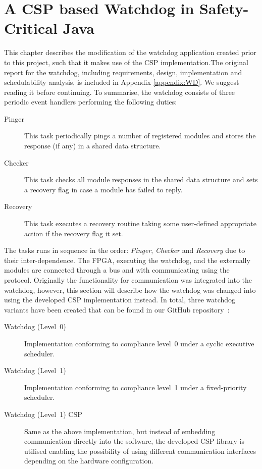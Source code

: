 \chapter{A CSP based Watchdog in Safety-Critical Java}
\label{chapter:watchdogcsp}
This chapter describes the modification of the watchdog application created prior to this project, such that it makes use of the CSP implementation.The original report for the watchdog, including requirements, design, implementation and schedulability analysis, is included in Appendix \ref{appendix:WD}. We suggest reading it before continuing. To summarise, the watchdog consists of three periodic event handlers performing the following duties:

\begin{description}
	\item[Pinger] This task periodically pings a number of registered modules and stores the response (if any) in a shared data structure.
	\item[Checker] This task checks all module responses in the shared data structure and sets a recovery flag in case a module has failed to reply.
	\item[Recovery] This task executes a recovery routine taking some user-defined appropriate action if the recovery flag it set. 
\end{description}

The tasks runs in sequence in the order: \textit{Pinger}, \textit{Checker} and \textit{Recovery} due to their inter-dependence. The FPGA, executing the watchdog, and the externally modules are connected through a bus and with communicating using the \iic protocol. Originally the functionality for \iic communication was integrated into the watchdog, however, this section will describe how the watchdog was changed into using the developed CSP implementation instead. In total, three watchdog variants have been created that can be found in our GitHub repository~\cite{SW902e12:CSPinSCJ}:

\begin{description}
	\item[Watchdog (Level~0)] Implementation conforming to compliance level~0 under a cyclic executive scheduler.
	\item[Watchdog (Level~1)] Implementation conforming to compliance level~1 under a fixed-priority scheduler. 
	\item[Watchdog (Level~1) CSP] Same as the above implementation, but instead of embedding \iic communication directly into the software, the developed CSP library is utilised enabling the possibility of using different communication interfaces depending on the hardware configuration.
\end{description}

